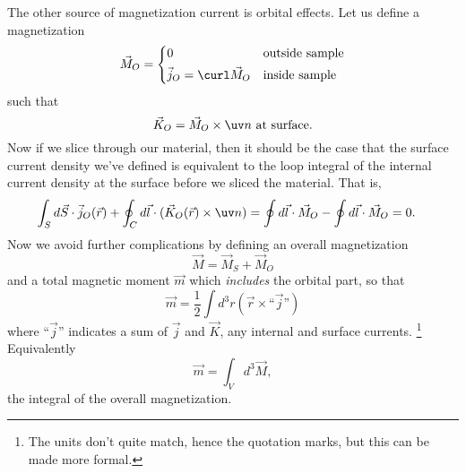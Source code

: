 The other source of magnetization current is orbital effects. Let us define a magnetization
\begin{equation}
    \vec M_O = \begin{cases*}
        0 & outside sample\\
        \vec j_O = \curl \vec M_O & inside sample
    \end{cases*}
\end{equation}
such that
\begin{equation}
    \vec K_O = \vec M_O \times \uv n \text{ at surface}.
\end{equation}
Now if we slice through our material, then it should be the case that the surface current density we've defined is equivalent to the loop integral of the internal current density at the surface before we sliced the material. That is,
\begin{align}
    \int_S d\vec S \cdot \vec j_O (\vec r) + \oint_C d\vec l \cdot (\vec K_O(\vec r) \times \uv n) &= \oint d\vec l \cdot \vec M_O - \oint d\vec l \cdot \vec M_O =0.
\end{align}
Now we avoid further complications by defining an overall magnetization
\begin{equation}
    \vec M = \vec M_S + \vec M_O
\end{equation}
and a total magnetic moment $\vec m$ which \emph{includes} the orbital part, so that
\begin{equation}
    \vec m = \frac{1}{2} \int d^3 r(\vec r \times \text{``$\vec j$''})
\end{equation}
where ``$\vec j$'' indicates a sum of $\vec j$ and $\vec K$, any internal and surface currents.%
    \footnote{The units don't quite match, hence the quotation marks, but this can be made more formal.}
Equivalently
\begin{equation}
    \vec m = \int_V d^3 \vec M,
\end{equation}
the integral of the overall magnetization.